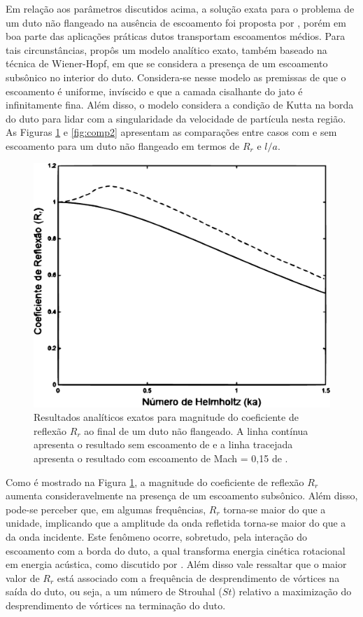 Em relação aos parâmetros discutidos acima, a solução exata para o problema de um duto não flangeado na ausência de escoamento foi proposta por , porém em boa parte das aplicações práticas dutos transportam escoamentos médios. Para tais circunstâncias,  propôs um modelo analítico exato, também baseado na técnica de Wiener-Hopf, em que se considera a presença de um escoamento subsônico no interior do duto. Considera-se nesse modelo as premissas de que o escoamento é uniforme, invíscido e que a camada cisalhante do jato é infinitamente fina. Além disso, o modelo considera a condição de Kutta na borda do duto para lidar com a singularidade da velocidade de partícula nesta região. As Figuras \ref{fig:comp1} e \ref{fig:comp2} apresentam as comparações entre casos com e sem escoamento para um duto não flangeado em termos de $R_{r}$ e $l/a$.

\begin{figure}[ht!]
\centering
  \includegraphics[width=.9\linewidth]{figuras/abs_r_comparacao.pdf}
  \caption[Magnitudes do coeficiente de reflexão $R_{r}$]{Resultados analíticos exatos para magnitude do coeficiente de reflexão $R_{r}$ ao final de um duto não flangeado. A linha contínua apresenta o resultado sem escoamento de  e a linha tracejada apresenta o resultado com escoamento de Mach = 0,15 de .}
  \label{fig:comp1}
\end{figure}

\newpage
Como é mostrado na Figura \ref{fig:comp1}, a magnitude do coeficiente de reflexão $R_{r}$ aumenta consideravelmente na presença de um escoamento subsônico. Além disso, pode-se perceber que, em algumas frequências, $R_{r}$ torna-se maior do que a unidade, implicando que a amplitude da onda refletida torna-se maior do que a da onda incidente. Este fenômeno ocorre, sobretudo, pela interação do escoamento com a borda do duto, a qual transforma energia cinética rotacional em energia acústica, como discutido por . Além disso vale ressaltar que o maior valor de $R_{r}$ está associado com a frequência de desprendimento de vórtices na saída do duto, ou seja, a um número de Strouhal ($St$) relativo a maximização do desprendimento de vórtices na terminação do duto.  

